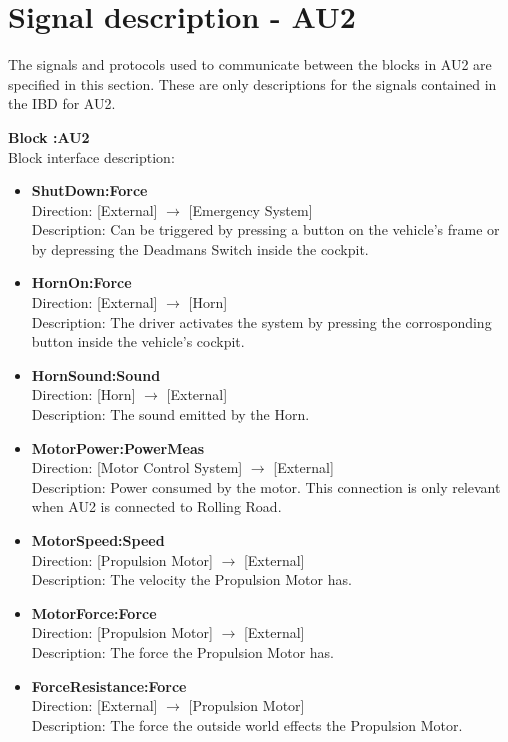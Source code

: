 \section{Signal description - AU2}
The signals and protocols used to communicate between the blocks in AU2 are specified in this section. These are only descriptions for the signals contained in the IBD for AU2.

\textbf{Block :AU2}\\
Block interface description:
\begin{itemize}
	\item \textbf{ShutDown:Force}\\
	Direction: [External] $\rightarrow$ [Emergency System]\\
	Description: Can be triggered by pressing a button on the vehicle's frame or by depressing the Deadmans Switch inside the cockpit.	
	\item \textbf{HornOn:Force}\\
	Direction: [External] $\rightarrow$ [Horn]\\
	Description: The driver activates the system by pressing the corrosponding button inside the vehicle's cockpit.
	\item \textbf{HornSound:Sound}\\
	Direction: [Horn] $\rightarrow$ [External]\\
	Description: The sound emitted by the Horn.
	\item \textbf{MotorPower:PowerMeas}\\
	Direction: [Motor Control System] $\rightarrow$ [External]\\
	Description: Power consumed by the motor. This connection is only relevant when AU2 is connected to Rolling Road.
	\item \textbf{MotorSpeed:Speed}\\
	Direction: [Propulsion Motor] $\rightarrow$ [External]\\
	Description: The velocity the Propulsion Motor has.
	\item \textbf{MotorForce:Force}\\
	Direction: [Propulsion Motor] $\rightarrow$ [External]\\
	Description: The force the Propulsion Motor has.
	\item \textbf{ForceResistance:Force}\\
	Direction: [External] $\rightarrow$ [Propulsion Motor]\\
	Description: The force the outside world effects the Propulsion Motor.

\end{itemize}
